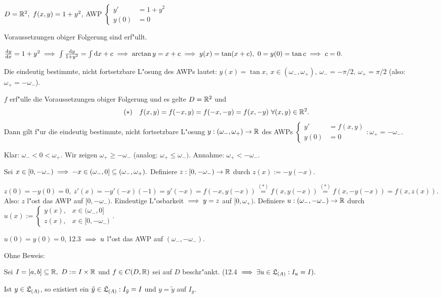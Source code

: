 \documentclass{article}
\begin{document}
\begin{beispiele}
\item $D=\mathbb{R}^2,\ f(x,y) = 1+y^2$, AWP $\begin{cases} y' & = 1+y^2 \\ y(0) & =0 \end{cases}$

Voraussetzungen obiger Folgerung sind erf"ullt.

$\frac{\mathrm{d} y}{\mathrm{d} x} = 1+y^2 \implies \int \frac{\mathrm{d} y}{1+y^2} = \int \mathrm{d} x + c \implies \arctan y = x+c \implies y(x) = \tan (x+c),\ 0=y(0) = \tan c \implies c=0.$

Die eindeutig bestimmte, nicht fortsetzbare L"osung des AWPs lautet: $y(x) = \tan x,\ x \in (\omega_-,\omega_+),\ \omega_- = -\pi/2,\ \omega_+ = \pi/2$ (also: $\omega_+ = -\omega_-$).

\item $f$ erf"ulle die Voraussetzungen obiger Folgerung und es gelte $D = \mathbb{R}^2$ und \[(*)\quad f(x,y) = f(-x,y) = f(-x,-y) = f(x,-y)\ \forall (x,y) \in \MdR^2.\] Dann gilt f"ur die eindeutig bestimmte, nicht fortsetzbare L"osung $y:(\omega_-,\omega_+) \to \mathbb{R}$ des AWPs $\begin{cases} y' &=f(x,y)\\ y(0) &=0 \end{cases}: \omega_+ = -\omega_-$.

\begin{beweis}
Klar: $\omega_-<0<\omega_+$. Wir zeigen $\omega_+\ge-\omega_-$ (analog: $\omega_+ \le \omega_-).$ Annahme: $\omega_+<-\omega_-$.

Sei $x\in[0,-\omega_-) \implies -x \in (\omega_-,0] \subseteq (\omega_-,\omega_+).$ Definiere $z:[0,-\omega_-)\to\mathbb{R}$ durch $z(x):=-y(-x).$

$z(0) = -y(0) = 0,\ z'(x) = -y'(-x)(-1) = y'(-x) = f(-x,y(-x)) \overset{(*)}{=} f(x,y(-x)) \overset{(*)}{=} f(x,-y(-x)) = f(x,z(x)).$ Also: $z$ l"ost das AWP auf $[0,-\omega_-).$ Eindeutige L"osbarkeit $\implies y=z$ auf $[0,\omega_+)$. Definiere $u:(\omega_-,-\omega_-) \to \mathbb{R}$ durch $u(x):=\begin{cases} y(x), & x\in (\omega_-,0]\\ z(x), & x\in[0,-\omega_-) \end{cases}.$

$u(0) = y(0) = 0$, 12.3 $\implies u$ l"ost das AWP auf $(\omega_-,-\omega_-)$.
\end{beweis}
\end{beispiele}

Ohne Beweis:

\begin{satz}
Sei $I=[a,b] \subseteq \MdR,\ D:=I\times\MdR$ und $f \in C(D,\mathbb{R})$ sei auf $D$ beschr"ankt. (12.4 $\implies \exists u\in\mathfrak{L}_{(A)}: I_u=I).$

Ist $y\in\mathfrak{L}_{(A)}$, so existiert ein $\tilde{y}\in\mathfrak{L}_{(A)}: I_{\tilde{y}} = I$ und $y=\tilde{y}$ auf $I_y$.
\end{satz}
\end{document}
